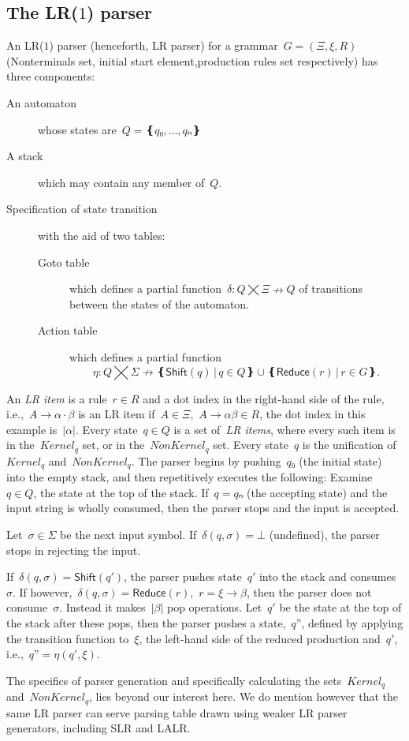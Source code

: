 \subsection{The LR($1$) parser}
An LR($1$) parser (henceforth, LR parser) for a grammar~$G=(Ξ,ξ,R)$ (Nonterminals set, initial start element,production rules set respectively)
  has three components:
\begin{description}
  \item[An automaton] whose states are~$Q=❴q₀,…,qₙ❵$
  \item[A stack] which may contain any member of~$Q$.
  \item[Specification of state transition] with the aid of two tables:
  \begin{description}
    \item[Goto table] which defines a partial function~$δ:Q⨉Ξ↛Q$ of transitions
    between the states of the automaton.
    \item[Action table] which
    defines a partial function\[η:Q⨉Σ↛ ❴ \textsf{Shift}(q) \,|\, q∈Q❵ ∪ ❴\textsf{Reduce}(r) \,| \, r∈G❵.\]
  \end{description}
\end{description}
An \emph{LR item} is a rule~$r∈R$ and a dot index in the right-hand side of the rule,
  i.e.,~$A→α·β$ is an LR item if~$A∈Ξ$,~$A→αβ∈R$,
  the dot index in this example is~$|α|$.
Every state~$q∈Q$ is a set of~\emph{LR items},
  where every such item is in the~$Kernel_{q}$ set,
  or in the~$NonKernel_{q}$ set.
Every state~$q$ is the unification of~$Kernel_{q}$ and~$NonKernel_{q}$.
The parser begins by pushing~$q₀$ (the initial state) into the empty stack,
and then repetitively executes the following:
Examine~$q∈Q$, the state at the top of the stack.
If~$q=qₙ$ (the accepting state) and the input string is wholly consumed, then the parser stops and the input is accepted.

Let~$σ∈Σ$ be the next input symbol.
If~$δ(q,σ)=⊥$ (undefined), the parser stops in rejecting the input.

If~$δ(q,σ) = \textsf{Shift}(q')$, the parser pushes state~$q'$
into the stack and consumes~$σ$.
If however,~$δ(q,σ) = \textsf{Reduce}(r)$,~$r=ξ→β$,
then the parser does not consume~$σ$.
Instead it makes~$|β|$ pop operations.
Let~$q'$ be the state at the top of the stack after these pops, then
the parser pushes a state,~$q”$,
defined by applying the transition function to~$ξ$, the left-hand side of the reduced production and~$q'$,
i.e.,~$q”=η(q',ξ)$.

The specifics of parser generation and specifically
  calculating the sets~$Kernel_{q}$ and~$NonKernel_{q}$, lies beyond our interest here.
We do mention however that the same LR parser can serve parsing table drawn using weaker LR parser generators,
including SLR and LALR\@.


